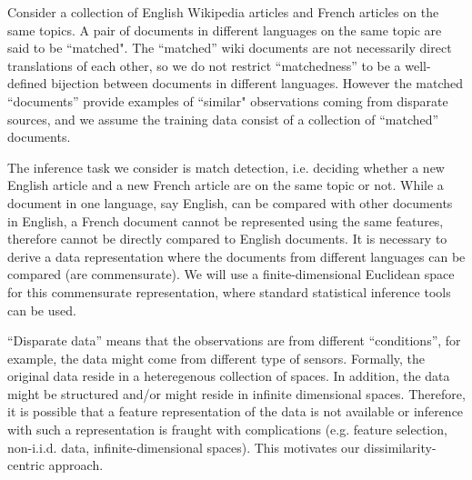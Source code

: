 \documentclass[12pt,oneside,final]{thesis}
\begin{document}
	Consider a collection of  English Wikipedia articles  and   French articles on the same topics. A pair of documents in different languages on the same topic are said to be ``matched". The ``matched'' wiki documents are  not necessarily direct translations of each other, so  we do not restrict ``matchedness'' to be a well-defined bijection between documents in different languages.
	However the matched ``documents''  provide examples of  ``similar"  observations coming from disparate sources, and we assume the training data consist of  a collection of ``matched'' documents.
	
  The inference task we consider is match detection, i.e. deciding whether a new English article and a new French article are on the same topic or not. While  a document in one language, say English, can be compared with other documents in English, a  French document  cannot be represented using the same features, therefore cannot be directly compared to English documents.  It is necessary   to derive a data representation  where the  documents from different languages can be compared (are commensurate).  %
	We will use a finite-dimensional Euclidean space for  this commensurate representation, where standard  statistical inference tools can be used.
	
     ``Disparate data''  means that  the observations are from  different ``conditions'', for example, the data might come from different type of sensors. Formally, the original data  reside in a heteregenous collection of  spaces.  In addition, the data might be structured and/or might reside in  infinite dimensional spaces. Therefore, it is possible that a feature representation of the data is not available or inference with such a representation is fraught with complications (e.g. feature selection, non-i.i.d. data, infinite-dimensional spaces). This motivates our  dissimilarity-centric approach.
		
\end{document}
